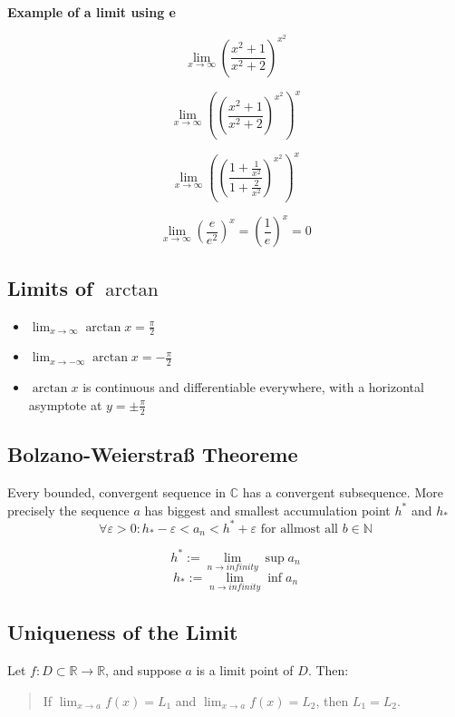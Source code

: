 \textbf{Example of a limit using e}

\[
\lim_{x \to \infty}\left(\frac{x^2 + 1}{x^2 +2}\right)^{x^2}
\]

\[
\lim_{x \to \infty} \left(\left(\frac{x^2 + 1}{x^2 +2}\right)^{x^2}\right)^x
\]

\[
\lim_{x \to \infty} \left(\left(\frac{1 + \frac{1}{x^2}}{1 + \frac{2}{x^2}}\right)^{x^2}\right)^x
\]

\[
\lim_{x \to \infty} \left(\frac{e}{e^2}\right)^x = \left(\frac{1}{e}\right)^x = 0
\]


\subsection{Limits of \texorpdfstring{\(\arctan\)}{arctan}}

\begin{itemize}[label=\(-\)]
\item \(\displaystyle \lim_{x \to \infty} \arctan x = \frac{\pi}{2}\)
\item \(\displaystyle \lim_{x \to -\infty} \arctan x = -\frac{\pi}{2}\)
\item \(\arctan x\) is continuous and differentiable everywhere, with a horizontal asymptote at \(y = \pm \frac{\pi}{2}\)
\end{itemize}

\subsection{Bolzano-Weierstraß Theoreme}

Every bounded, convergent sequence in \(\mathbb{C}\) has a convergent subsequence.
More precisely the sequence \(a\) has biggest and smallest accumulation point \(h^*\) and \(h_*\)
\[\forall \varepsilon > 0 : h_* - \varepsilon < a_n < h^{*} + \varepsilon \text{ for allmost all } b \in \mathbb{N}\]

\[h^* := \lim_{n \to infinity} \sup a_n\]
\[h_* := \lim_{n \to infinity} \inf a_n\]

\subsection{Uniqueness of the Limit}

Let \( f: D \subset \mathbb{R} \to \mathbb{R} \), and suppose \( a \) is a limit point of \( D \). Then:

\begin{quote}
If \( \lim_{x \to a} f(x) = L_1 \) and \( \lim_{x \to a} f(x) = L_2 \), then \( L_1 = L_2 \).
\end{quote}

